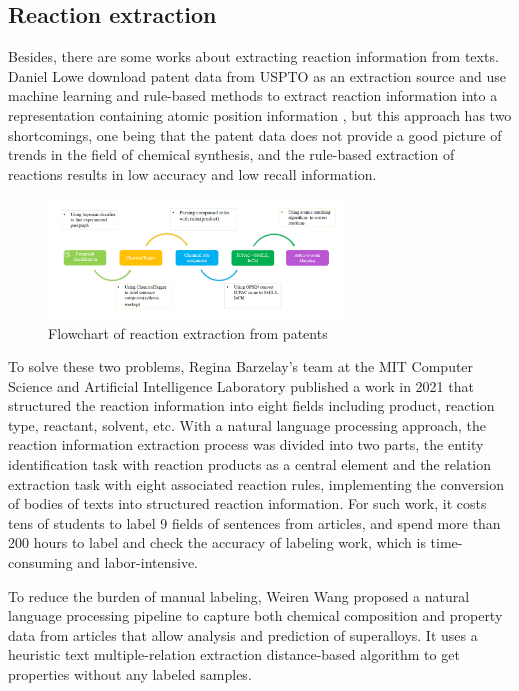 \documentclass[%
 aip,
 jmp,%
 amsmath,amssymb,
 reprint,%
]{revtex4-2}
\begin{document}
\subsection{Reaction extraction}
Besides, there are some works about extracting reaction information from texts.
Daniel Lowe download patent data from USPTO as an extraction source and use machine learning and rule-based 
methods to extract reaction information into a representation containing atomic position information \cite{lowe2012extraction}, 
but this approach has two shortcomings, one being that the patent data does not provide a good picture 
of trends in the field of chemical synthesis, and the rule-based extraction of reactions results in 
low accuracy and low recall information.

\begin{figure}[htbp]
 \centering
 \includegraphics[width=0.7\textwidth]{figure/8.png}
 \caption{ Flowchart of reaction extraction from patents }
 \label{ Fig.8 }
\end{figure}

To solve these two problems, Regina Barzelay's team at the MIT Computer Science and Artificial Intelligence Laboratory published a work 
in 2021 that structured the reaction information into eight fields including product, reaction type, reactant, solvent, etc. With a 
natural language processing approach, the reaction information extraction process was divided into two parts, the entity identification task
with reaction products as a central element and the relation extraction task with eight associated reaction rules,
implementing the conversion of bodies of texts into structured reaction information\cite{guo2021automated}. For such work, it costs tens of students to label 9 fields of sentences 
from articles, and spend more than 200 hours to label and check the accuracy of labeling work, which is time-consuming and labor-intensive.

To reduce the burden of manual labeling, Weiren Wang proposed a natural language processing pipeline to capture both chemical composition and property data 
from articles that allow analysis and prediction of superalloys. It uses a heuristic text multiple-relation extraction distance-based algorithm to get 
properties without any labeled samples\cite{wang2022automated}.
\end{document}
